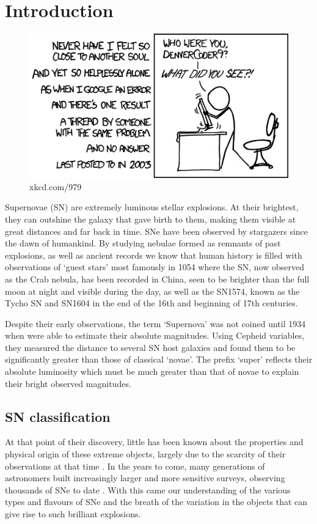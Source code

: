 \chapter{Introduction}  \label{Chapter1}

\begin{figure}[H]
  \centering
  \includegraphics{Figures/xkcd/chapter1.png}
  \caption*{xkcd.com/979}
\end{figure}

Supernovae (SN) are extremely luminous stellar explosions. At their brightest, they can outshine the galaxy that gave birth to them, making them visible at great distances and far back in time. SNe have been observed by stargazers since the dawn of humankind. By studying nebulae formed as remnants of past explosions, as well as ancient records we know that human history is filled with observations of `guest stars' most famously in 1054 where the SN, now observed as the Crab nebula, has been recorded in China, seen to be brighter than the full moon at night and visible during the day, as well as the SN1574, known as the Tycho SN and SN1604 in the end of the 16th and beginning of 17th centuries.

Despite their early observations, the term `Supernova' was not coined until 1934 when \citet{Baade1934} were able to estimate their absolute magnitudes. Using Cepheid variables, they measured the distance to several SN host galaxies and found them to be significantly greater than those of classical `novae'. The prefix `super' reflects their absolute luminosity which must be much greater than that of novae to explain their bright observed magnitudes.

\section{SN classification}
At that point of their discovery, little has been known about the properties and physical origin of these extreme objects, largely due to the scarcity of their observations at that time \citep{Zwicky1938}. In the years to come, many generations of astronomers built increasingly larger and more sensitive surveys, observing thousands of SNe to date \citep{Alsabti2017}. With this came our understanding of the various types and flavours of SNe and the breath of the variation in the objects that can give rise to such brilliant explosions.

